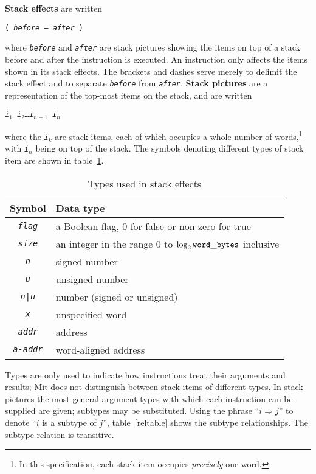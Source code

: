 \documentclass[a4paper]{article}
\newcommand{\spic}[1]{\texttt{\textsl{#1\/}}}
\begin{document}
{\bf Stack effects} are written

\centerline{\tt ( \spic{before — after} )}

\noindent where \spic{before} and \spic{after} are stack pictures showing the items on top
of a stack before and after the instruction is executed.
An instruction only affects the items shown in its
stack effects. The brackets and dashes serve merely to delimit the stack
effect and to separate \spic{before} from \spic{after}. {\bf Stack pictures}
are a representation of the top-most items on the stack, and are written

\centerline{\spic{i$_1$ i$_2$\dots i$_{n-1}$ i$_n$}}

\noindent where the \spic{i$_k$} are stack items, each of which occupies a whole number of words,\footnote{In this specification, each stack item occupies \emph{precisely} one word.} with \spic{i$_n$} being on top of the stack. The symbols denoting different types of stack item are shown in table~\ref{typetable}.

\begin{table}[htbp]
\begin{center}
\begin{tabular}{cl} \toprule
\bf Symbol & \bf Data type \\ \midrule
\spic{flag} & a Boolean flag, $0$ for false or non-zero for true \\
\spic{size} & an integer in the range $0$ to $\log_2{\tt word\_bytes}$ inclusive \\
\spic{n} & signed number \\
\spic{u} & unsigned number \\
\spic{n{\tt |}u} & number (signed or unsigned) \\
\spic{x} & unspecified word \\
\spic{addr} & address \\
\spic{a-addr} & word-aligned address \\
\bottomrule
\end{tabular}
\caption{\label{typetable}Types used in stack effects}
\end{center}
\end{table}

Types are only used to indicate how instructions treat their arguments and
results; Mit does not distinguish between stack items of different types. In
stack pictures the most general argument types with which each instruction can
be supplied are given; subtypes may be substituted. Using the phrase ``$i
\Rightarrow j$'' to denote ``$i$\/ is a subtype of $j$\/'', table~\ref{reltable}
shows the subtype relationships. The subtype relation is transitive.
\end{document}
